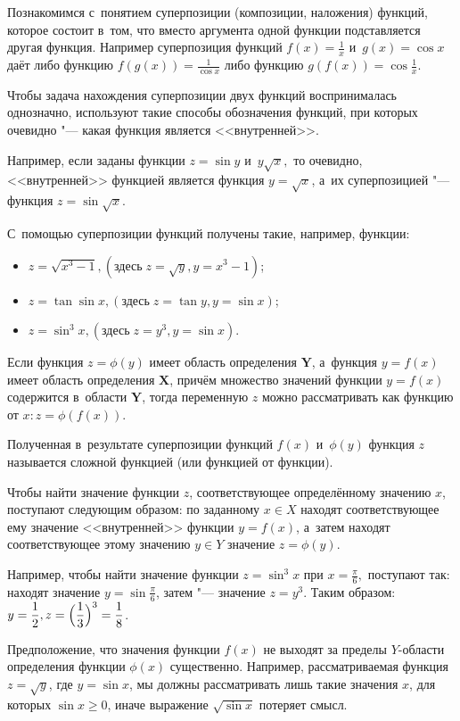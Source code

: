 Познакомимся с~понятием суперпозиции (композиции, наложения) функций,
которое состоит в~том, что вместо аргумента одной функции подставляется
другая функция. Например суперпозиция функций
$\displaystyle f(x) = \frac{1}{x}$ и~$g(x) = \cos x$
даёт либо функцию $\displaystyle f(g(x)) = \frac{1}{\cos x}$
либо функцию $\displaystyle g(f(x)) = \cos \frac{1}{x}.$

Чтобы задача нахождения суперпозиции двух функций воспринималась однозначно,
используют такие способы обозначения функций, при которых очевидно "---
какая функция является <<внутренней>>.

Например, если заданы функции $z = \sin y$ и~$y \sqrt{x},$
то очевидно, <<внутренней>> функцией является функция $y = \sqrt{x}$,
а~их суперпозицией "--- функция $z = \sin \sqrt{x}$.

С~помощью суперпозиции функций получены такие, например, функции:
\begin{itemize}
\item $z = \sqrt{x^{3} - 1}, (\text{здесь} \; z = \sqrt{y}, y = x^{3} - 1)$;
\item $z = \tan \sin x, (\text{здесь} \; z = \tan y, y = \sin x)$;
\item $z = \sin^{3} x, (\text{здесь} \; z = y^{3}, y = \sin x)$.
\end{itemize}

Если функция $z = \phi(y)$ имеет область определения $\mathbf{Y}$,
а~функция $y = f(x)$ имеет область определения $\mathbf{X}$,
причём множество значений функции $y = f(x)$ содержится в~области $\mathbf{Y}$,
тогда переменную $z$ можно рассматривать как функцию от $x: z = \phi(f(x))$.

Полученная в~результате суперпозиции функций $f(x)$ и~$\phi(y)$ функция $z$
называется сложной функцией (или функцией от функции).

Чтобы найти значение функции $z$, соответствующее определённому значению $x$,
поступают следующим образом: по заданному $x \in X$ находят соответствующее
ему значение <<внутренней>> функции $y = f(x)$, а~затем находят соответствующее
этому значению $y \in Y$ значение $z = \phi(y)$.

Например, чтобы найти значение функции $z = \sin^{3} x$ при
$\displaystyle x = \frac{\pi}{6},$ поступают так: находят значение
$\displaystyle y = \sin \frac{\pi}{6}$,
затем "--- значение $z = y^{3}$.
Таким образом:
$\displaystyle y = \frac{1}{2}, z = \Bigl(\frac{1}{3}\Bigr)^{3} = \frac{1}{8}$.

\begin{Note}
Предположение, что значения функции $f(x)$ не выходят за пределы
$Y$-области определения функции $\phi(x)$ существенно.
Например, рассматриваемая функция $z = \sqrt{y}$,
где $y = \sin x$, мы должны рассматривать лишь такие значения $x$,
для которых $\sin x \geqslant 0$, иначе выражение $\sqrt{\sin x}$
потеряет смысл.
\end{Note}

